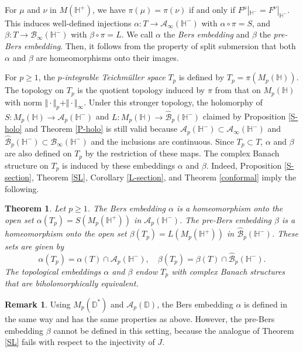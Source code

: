 \documentclass[amstex,12pt,reqno]{amsart}
\newtheorem{theorem}{Theorem}[section]
\theoremstyle{definition}
\newtheorem{remark}{Remark}
\begin{document}
For $\mu$ and $\nu$ in $M(\mathbb H^+)$,
we have $\pi(\mu)=\pi(\nu)$ if and only if $F^\mu|_{\mathbb H^-}=F^\nu|_{\mathbb H^-}$. This induces
well-defined injections $\alpha:T \to {\mathcal A}_\infty(\mathbb H^-)$ with
$\alpha \circ \pi=S$, and $\beta:T \to {\mathcal B}_\infty(\mathbb H^-)$ with
$\beta \circ \pi=L$. We call $\alpha$ the {\it Bers embedding} and $\beta$ the {\it pre-Bers embedding}.
Then, it follows from the property of split submersion that both $\alpha$ and $\beta$ are
homeomorphisms onto their images.

For $p \geq 1$, the {\it $p$-integrable Teich\-m\"ul\-ler space} $T_p$ is defined by $T_p=\pi(M_p(\mathbb H))$.
The topology on $T_p$ is the quotient topology induced by $\pi$ from
that on $M_p(\mathbb H)$ with norm $\Vert \cdot \Vert_p+\Vert \cdot \Vert_\infty$.
Under this stronger topology, the holomorphy of $S:M_p(\mathbb H) \to {\mathcal A}_p(\mathbb H^-)$
and $L:M_p(\mathbb H) \to \widehat{\mathcal B}_p(\mathbb H^-)$ claimed by Proposition \ref{S-holo} and
Theorem \ref{P-holo} is still valid because ${\mathcal A}_p(\mathbb H^-) \subset {\mathcal A}_\infty(\mathbb H^-)$
and $\widehat{\mathcal B}_p(\mathbb H^-) \subset {\mathcal B}_\infty(\mathbb H^-)$ and the inclusions are continuous.
Since $T_p \subset T$, $\alpha$ and $\beta$ are also defined on $T_p$ by the restriction of these maps.
The complex Banach structure on $T_p$ is induced by these embeddings $\alpha$ and $\beta$. Indeed, 
Proposition \ref{S-section}, Theorem \ref{SL}, Corollary \ref{L-section},
and Theorem \ref{conformal} imply the following.

\begin{theorem}\label{Bersemb}
Let $p \geq 1$.
The Bers embedding $\alpha$ is
a homeomorphism onto the open set $\alpha(T_p)=S(M_p(\mathbb H^+))$ in ${\mathcal A}_p(\mathbb H^-)$.
The pre-Bers embedding $\beta$ is
a homeomorphism onto the open set $\beta(T_p)=L(M_p(\mathbb H^+))$ in $\widehat{\mathcal B}_p(\mathbb H^-)$.
These sets are given by
\begin{equation}\label{alphabeta}
\alpha(T_p)=\alpha(T) \cap {\mathcal A}_p(\mathbb H^-),\quad
\beta(T_p)=\beta(T) \cap \widehat{\mathcal B}_p(\mathbb H^-).
\end{equation}
The topological embeddings $\alpha$ and $\beta$ endow $T_p$ with complex Banach structures that are
biholomorphically equivalent.
\end{theorem}

\begin{remark}\label{remark7}
Using $M_p(\mathbb D^*)$ and ${\mathcal A}_p(\mathbb D)$, the Bers embedding $\alpha$ is
defined in the same way and has the same properties as above. However, 
the pre-Bers embedding $\beta$ cannot be defined in this setting, because 
the analogue of Theorem \ref{SL} fails with respect to the injectivity of $J$.
\end{remark}
\end{document}
